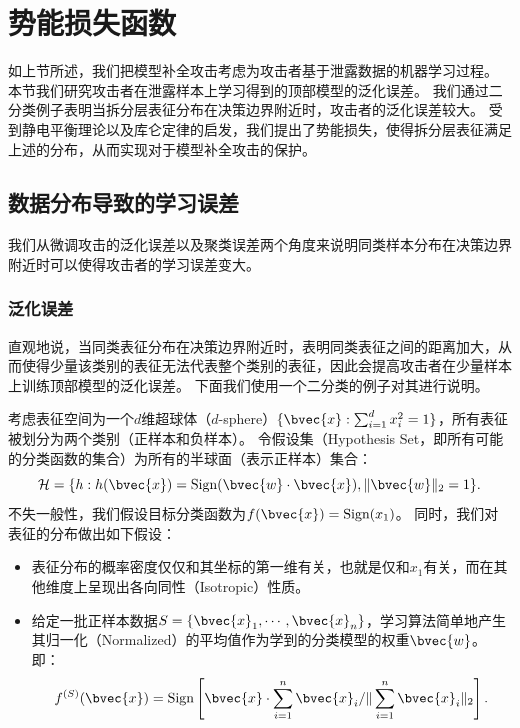 \section{势能损失函数}
如上节所述，我们把模型补全攻击考虑为攻击者基于泄露数据的机器学习过程。
%
本节我们研究攻击者在泄露样本上学习得到的顶部模型的泛化误差。
我们通过二分类例子表明当拆分层表征分布在决策边界附近时，攻击者的泛化误差较大。
%
受到静电平衡理论以及库仑定律的启发，我们提出了势能损失，使得拆分层表征满足上述的分布，从而实现对于模型补全攻击的保护。
%

\subsection{数据分布导致的学习误差}
我们从微调攻击的泛化误差以及聚类误差两个角度来说明同类样本分布在决策边界附近时可以使得攻击者的学习误差变大。


\subsubsection{泛化误差}
直观地说，当同类表征分布在决策边界附近时，表明同类表征之间的距离加大，从而使得少量该类别的表征无法代表整个类别的表征，因此会提高攻击者在少量样本上训练顶部模型的泛化误差。
%
下面我们使用一个二分类的例子对其进行说明。
%

考虑表征空间为一个$d$维超球体（$d$-sphere）$\{ \bvec{x}: \sum_{i=1}^d x_i^2 = 1\}$，所有表征被划分为两个类别（正样本和负样本）。
令假设集（Hypothesis Set，即所有可能的分类函数的集合）为所有的半球面（表示正样本）集合：
\begin{equation}
    \mathcal H = \{ h: h(\bvec{x}) = \text{Sign}(\bvec{w} \cdot \bvec{x}), \Vert \bvec{w} \Vert_2 = 1\}.
\end{equation}
不失一般性，我们假设目标分类函数为$f(\bvec{x}) = \text{Sign}(x_1)$。
同时，我们对表征的分布做出如下假设：
\begin{itemize}
    \item 表征分布的概率密度仅仅和其坐标的第一维有关，也就是仅和$x_1$有关，而在其他维度上呈现出各向同性（Isotropic）性质。
    \item 给定一批正样本数据$S = \{\bvec{x}_1, \cdots, \bvec{x}_n\}$，学习算法简单地产生其归一化（Normalized）的平均值作为学到的分类模型的权重$\bvec{w}$。
    即：
    \begin{equation}
        f^{(S)}(\bvec{x}) = \text{Sign}\left[ \bvec{x} \cdot \sum_{i=1}^n {\bvec{x}_i} / \Vert \sum_{i=1}^n {\bvec{x}_i}\Vert_2 \right].
    \end{equation}
\end{itemize}

